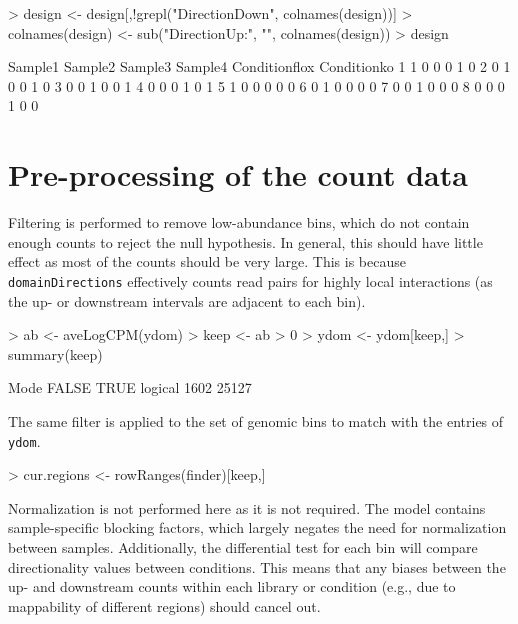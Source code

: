 \documentclass[12pt]{report}
\renewenvironment{Schunk}{\vspace{0pt}}{\vspace{0pt}}
\newcommand{\code}[1]{{\small\texttt{#1}}}
\begin{document}
\begin{Schunk}
\begin{Sinput}
> design <- design[,!grepl("DirectionDown", colnames(design))]
> colnames(design) <- sub("DirectionUp:", "", colnames(design)) 
> design
\end{Sinput}
\begin{Soutput}
  Sample1 Sample2 Sample3 Sample4 Conditionflox Conditionko
1       1       0       0       0             1           0
2       0       1       0       0             1           0
3       0       0       1       0             0           1
4       0       0       0       1             0           1
5       1       0       0       0             0           0
6       0       1       0       0             0           0
7       0       0       1       0             0           0
8       0       0       0       1             0           0
\end{Soutput}
\end{Schunk}

\section{Pre-processing of the count data}
Filtering is performed to remove low-abundance bins, which do not contain enough counts to reject the null hypothesis.
In general, this should have little effect as most of the counts should be very large.
This is because \code{domainDirections} effectively counts read pairs for highly local interactions (as the up- or downstream intervals are adjacent to each bin).

\begin{Schunk}
\begin{Sinput}
> ab <- aveLogCPM(ydom)
> keep <- ab > 0
> ydom <- ydom[keep,]
> summary(keep)
\end{Sinput}
\begin{Soutput}
   Mode   FALSE    TRUE 
logical    1602   25127 
\end{Soutput}
\end{Schunk}

The same filter is applied to the set of genomic bins to match with the entries of \code{ydom}. 

\begin{Schunk}
\begin{Sinput}
> cur.regions <- rowRanges(finder)[keep,]
\end{Sinput}
\end{Schunk}

Normalization is not performed here as it is not required. 
The model contains sample-specific blocking factors, which largely negates the need for normalization between samples.
Additionally, the differential test for each bin will compare directionality values between conditions.
This means that any biases between the up- and downstream counts within each library or condition (e.g., due to mappability of different regions) should cancel out.
\end{document}
